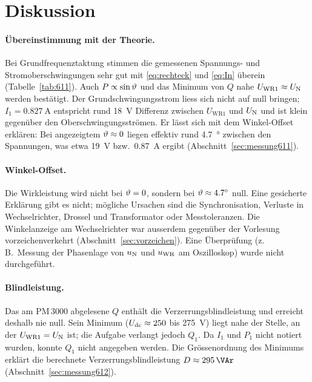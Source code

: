 \section{Diskussion}
\label{sec:diskussion}

\paragraph{Übereinstimmung mit der Theorie.} Bei Grundfrequenztaktung stimmen die gemessenen Spannungs- und Stromoberschwingungen sehr gut mit \eqref{eq:rechteck} und \eqref{eq:In} überein (Tabelle~\ref{tab:611}). Auch $P\propto\sin\vartheta$ und das Minimum von $Q$ nahe $U_{\mathrm{WR1}}\approx U_{\mathrm{N}}$ werden bestätigt. Der Grundschwingungsstrom liess sich nicht auf null bringen; $I_1=\SI{0.827}{\ampere}$ entspricht rund \SI{18}{\volt} Differenz zwischen $U_{\mathrm{WR1}}$ und $U_{\mathrm{N}}$ und ist klein gegenüber den Oberschwingungsströmen. Er lässt sich mit dem Winkel-Offset erklären: Bei angezeigtem $\vartheta\approx0$ liegen effektiv rund \SI{4.7}{\degree} zwischen den Spannungen, was etwa \SI{19}{\volt} bzw.\ \SI{0.87}{\ampere} ergibt (Abschnitt~\ref{sec:messung611}).

\paragraph{Winkel-Offset.} Die Wirkleistung wird nicht bei $\vartheta=0$, sondern bei $\vartheta\approx\SI{4.7}{\degree}$ null. Eine gesicherte Erklärung gibt es nicht; mögliche Ursachen sind die Synchronisation, Verluste in Wechselrichter, Drossel und Transformator oder Messtoleranzen. Die Winkelanzeige am Wechselrichter war ausserdem gegenüber der Vorlesung vorzeichenverkehrt (Abschnitt~\ref{sec:vorzeichen}). Eine Überprüfung (z.\,B.\ Messung der Phasenlage von $u_{\mathrm{N}}$ und $u_{\mathrm{WR}}$ am Oszilloskop) wurde nicht durchgeführt.

\paragraph{Blindleistung.} Das am PM\,3000 abgelesene $Q$ enthält die Verzerrungsblindleistung und erreicht deshalb nie null. Sein Minimum ($U_{\mathrm{dc}}\approx250$ bis \SI{275}{\volt}) liegt nahe der Stelle, an der $U_{\mathrm{WR1}}=U_{\mathrm{N}}$ ist; die Aufgabe verlangt jedoch $Q_1$. Da $I_1$ und $P_1$ nicht notiert wurden, konnte $Q_1$ nicht angegeben werden. Die Grössenordnung des Minimums erklärt die berechnete Verzerrungsblindleistung $D\approx\SI{295}{\VAr}$ (Abschnitt~\ref{sec:messung612}).

